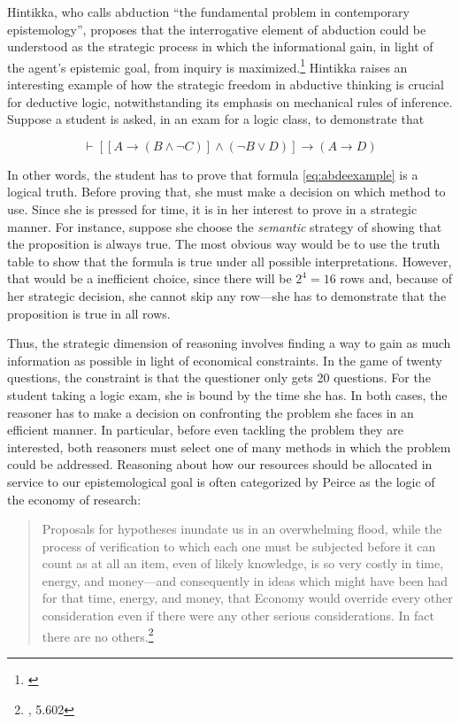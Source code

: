 Hintikka, who calls abduction ``the fundamental problem in contemporary epistemology'', proposes that the interrogative element of abduction could be understood as the strategic process in which the informational gain, in light of the agent's epistemic goal, from inquiry is maximized.\footnote{\cite{hintikka}} Hintikka raises an interesting example of how the strategic freedom in abductive thinking is crucial for deductive logic, notwithstanding its emphasis on mechanical rules of inference. Suppose a student is asked, in an exam for a logic class, to demonstrate that

\begin{equation}
	\vdash [[A\to(B\wedge \neg C)] \wedge (\neg B \vee D) ]\to (A\to D)
	\label{eq:abdeexample}
\end{equation}

 
 
 In other words, the student has to prove that formula \ref{eq:abdeexample} is a logical truth. Before proving that, she must make a decision on which method to use. Since she is pressed for time, it is in her interest to prove in a strategic manner. For instance, suppose she choose the \emph{semantic} strategy of showing that the proposition is  always true. The most obvious way would be to use the truth table to show that the formula is true under all possible interpretations. However, that would be a inefficient choice, since there will be $2^4=16$ rows and, because of her strategic decision, she cannot skip any row---she has to demonstrate that the proposition is true in all rows. 


Thus, the strategic dimension of reasoning involves finding a way to gain as much information as possible in light of economical constraints. In the game of twenty questions, the constraint is that the questioner only gets 20 questions. For the student taking a logic exam, she is bound by the time she has. In both cases, the reasoner has to make a decision on confronting the problem she faces in an efficient manner. In particular, before even tackling the problem they are interested, both reasoners must select one of many methods in which the problem could be addressed. Reasoning about how our resources should be allocated in service to our epistemological goal is often categorized by Peirce as the logic of the economy of research:

\begin{quote}
Proposals for hypotheses inundate us in an overwhelming flood, while the process of verification to which each one must be subjected before it can count as at all an item, even of likely knowledge, is so very costly in time, energy, and money---and consequently in ideas which might have been had for that time, energy, and money, that Economy would override every other consideration even if there were any other serious considerations. In fact there are no others.\footnote{\cite{CP}, 5.602}	
\end{quote}

